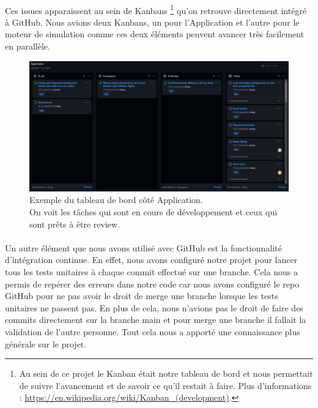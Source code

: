 \documentclass{EPUProjetDi}
\begin{document}
\paragraph{}
Ces issues apparaissent au sein de Kanbans \footnote{Au sein de ce projet le Kanban était notre tableau de bord et nous permettait de suivre 
l'avancement et de savoir ce qu'il restait à faire. Plus d'informations : \url{https://en.wikipedia.org/wiki/Kanban_(development)}.}
qu'on retrouve directement intégré à GitHub. Nous avions deux Kanbans, un pour l'Application et l'autre pour le moteur de simulation comme ces deux éléments peuvent avancer très facilement en parallèle.

\begin{figure}[h]
\centering
\includegraphics[scale=.3]{kanban.png}
\caption{Exemple du tableau de bord côté Application. 
\\On voit les tâches qui sont en cours de développement et ceux qui sont prêts à être review.}
\label{fig:Kanban}
\end{figure}

\paragraph{}
Un autre élément que nous avons utilisé avec GitHub est la fonctionnalité d'intégration continue. En effet, nous avons configuré notre projet 
pour lancer tous les tests unitaires à chaque commit effectué sur une branche.
Cela nous a permis de repérer des erreurs dans notre code car nous avons configuré le repo GitHub pour ne pas avoir le droit de merge une branche lorsque les tests unitaires ne passent pas.
En plus de cela, nous n'avions pas le droit de faire des commits directement sur la branche main et pour merge une branche il fallait la validation de l'autre personne.
Tout cela nous a apporté une connaissance plus générale sur le projet.
\end{document}
